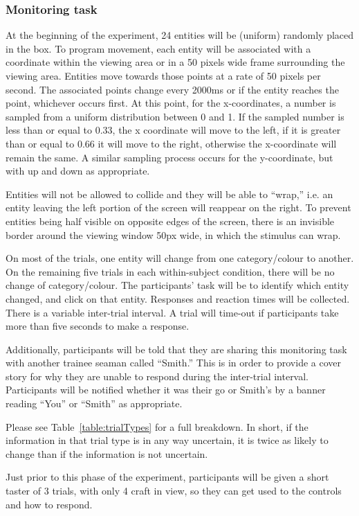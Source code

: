 \documentclass[doc, a4paper, apacite]{apa6}
\begin{document}
\subsubsection{Monitoring task}
At the beginning of the experiment, 24 entities will be (uniform) randomly placed in the box. 
To program movement, each entity will be associated with a coordinate within the viewing area or in a 50 pixels wide frame surrounding the viewing area. 
Entities move towards those points at a rate of 50 pixels per second.
The associated points change every 2000ms or if the entity reaches the point, whichever occurs first. 
At this point, for the x-coordinates, a number is sampled from a uniform distribution between 0 and 1.
If the sampled number is less than or equal to 0.33, the x coordinate will move to the left, if it is greater than or equal to 0.66 it will move to the right, otherwise the x-coordinate will remain the same. 
A similar sampling process occurs for the y-coordinate, but with up and down as appropriate. 

Entities will not be allowed to collide and they will be able to ``wrap,'' i.e. an entity leaving the left portion of the screen will reappear on the right.
To prevent entities being half visible on opposite edges of the screen, there is an invisible border around the viewing window 50px wide, in which the stimulus can wrap. 

On most of the trials, one entity will change from one category/colour to another. 
On the remaining five trials in each within-subject condition, there will be no change of category/colour. 
The participants' task will be to identify which entity changed, and click on that entity. 
Responses and reaction times will be collected. 
There is a variable inter-trial interval. 
A trial will time-out if participants take more than five seconds to make a response. 

Additionally, participants will be told that they are sharing this monitoring task with another trainee seaman called ``Smith.'' 
This is in order to provide a cover story for why they are unable to respond during the inter-trial interval. 
Participants will be notified whether it was their go or Smith's by a banner reading ``You'' or ``Smith'' as appropriate. 

Please see Table~\ref{table:trialTypes} for a full breakdown. 
In short, if the information in that trial type is in any way uncertain, it is twice as likely to change than if the information is not uncertain. 

Just prior to this phase of the experiment, participants will be given a short taster of 3 trials, with only 4 craft in view, so they can get used to the controls and how to respond. 

\clearpage
\newpage


\end{document}
